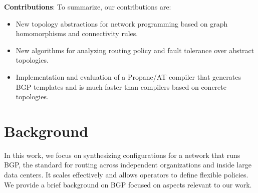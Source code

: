 \documentclass[numbers, 10pt, preprint]{sigplanconf}
\newcommand{\sysname}{{\text{}\small \sf Propane/AT}\xspace}
\begin{document}
\vspace{0.5em}
\noindent
\textbf{Contributions}: To summarize, our contributions are:
%
\begin{itemize}[noitemsep,nolistsep,label={\large\textbullet}]
\item New topology abstractions for network programming
based on graph homomorphisms and connectivity rules.
\item New algorithms for analyzing routing policy and fault tolerance over
abstract topologies.
\item Implementation and evaluation of a \sysname compiler that generates
BGP templates and is much faster
than compilers based on concrete topologies.
\end{itemize}




%
%
%
%

\section{Background}
\label{sec:background}

In this work, we focus on synthesizing configurations for a network that runs BGP, the standard for routing across independent organizations and inside large data centers. It scales effectively and allows operators to define flexible policies. We provide a brief background on BGP focused on aspects relevant to our work. 
\end{document}
